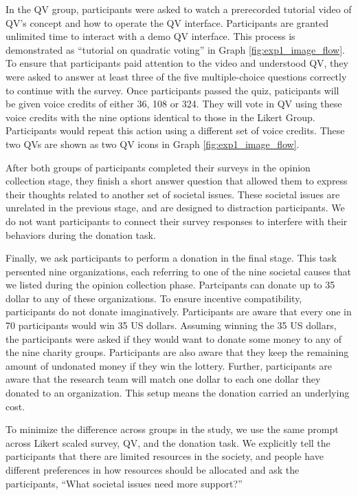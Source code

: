 In the QV group, 
participants were asked to watch 
a prerecorded tutorial video of QV's concept 
and how to operate the QV interface.
Participants are granted unlimited time 
to interact with a demo QV interface. 
This process is demonstrated as 
``tutorial on quadratic voting'' 
in Graph \ref{fig:exp1_image_flow}.
To ensure that participants paid attention to the video and understood QV, 
they were asked to answer at least three of the five multiple-choice questions 
correctly to continue with the survey.
Once participants passed the quiz, 
paticipants will be given voice credits of either 36, 108 or 324.
They will vote in QV using these voice credits 
with the nine options identical to those in the Likert Group.
Participants would repeat this action using a different set of voice credits.
These two QVs are shown as two QV icons in Graph \ref{fig:exp1_image_flow}.



After both groups of participants completed their surveys in the opinion collection stage, 
they finish a short answer question
that allowed them to express their thoughts 
related to another set of societal issues.
These societal issues are unrelated in the previous stage,
and are designed to distraction participants.
We do not want participants to connect their survey responses
to interfere with their behaviors during the donation task.

Finally, 
we ask participants to perform a donation in the final stage.
This task persented nine organizations,
each referring to one of the nine societal causes
that we listed during the opinion collection phase.
Partcipants can donate up to 35 dollar 
to any of these organizations.
To ensure incentive compatibility, 
participants do not donate imaginatively.
Participants are aware that every one in 70 participants would win 35 US dollars.
Assuming winning the 35 US dollars, 
the participants were asked 
if they would want to donate some money 
to any of the nine charity groups.
Participants are also aware that 
they keep the remaining amount of undonated money 
if they win the lottery.
Further, participants are aware that 
the research team will match one dollar to each one dollar 
they donated to an organization.
This setup means the donation carried an underlying cost.

To minimize the difference across groups in the study, 
we use the same prompt across Likert scaled survey, QV, and the donation task.
We explicitly tell the participants that 
there are limited resources in the society, 
and people have different preferences 
in how resources should be allocated and ask the participants, 
``What societal issues need more support?''


